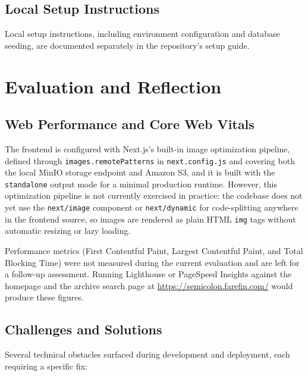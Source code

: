 \documentclass[12pt]{article}
\begin{document}
\subsection{Local Setup Instructions}
Local setup instructions, including environment configuration and database seeding, are documented separately in the repository's setup guide.

\section{Evaluation and Reflection}

\subsection{Web Performance and Core Web Vitals}
The frontend is configured with Next.js's built-in image optimization pipeline, defined through \texttt{images.remotePatterns} in \texttt{next.config.js} and covering both the local MinIO storage endpoint and Amazon S3, and it is built with the \texttt{standalone} output mode for a minimal production runtime. However, this optimization pipeline is not currently exercised in practice: the codebase does not yet use the \texttt{next/image} component or \texttt{next/dynamic} for code-splitting anywhere in the frontend source, so images are rendered as plain HTML \texttt{img} tags without automatic resizing or lazy loading.

Performance metrics (First Contentful Paint, Largest Contentful Paint, and Total Blocking Time) were not measured during the current evaluation and are left for a follow-up assessment. Running Lighthouse or PageSpeed Insights against the homepage and the archive search page at \url{https://semicolon.farefin.com/} would produce these figures.

\subsection{Challenges and Solutions}
Several technical obstacles surfaced during development and deployment, each requiring a specific fix:
\end{document}
